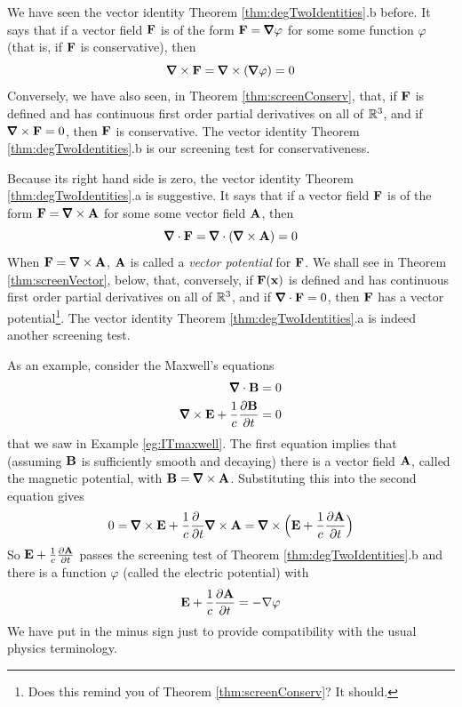 \begin{eg}\label{eg:ITmawellB}
We have seen the vector identity Theorem \ref{thm:degTwoIdentities}.b
before. It says that if a vector
field $\mathbf{F}$ is of the form $\vF = \vnabla\varphi$ for some some function 
$\varphi$ (that is, if $\mathbf{F}$ is conservative), then
\begin{equation*}
\vnabla\times\vF = \vnabla\times(\vnabla\varphi) = 0
\end{equation*}
Conversely, we have also seen, in Theorem \ref{thm:screenConserv}, 
that, if $\mathbf{F}$ is defined and has continuous first order partial 
derivatives on all of $\mathbb{R}^3$, and if $\vnabla\times\vF=0$, then
$\mathbf{F}$ is conservative. The vector identity Theorem \ref{thm:degTwoIdentities}.b
is our screening test for conservativeness.

Because its right hand side is zero, the vector identity Theorem \ref{thm:degTwoIdentities}.a is suggestive. 
It says that if a vector field $\mathbf{F}$ is of the form 
$\vF = \vnabla\times\vA$ for some some vector field $\mathbf{A}$, then
\begin{equation*}
\vnabla\cdot\vF = \vnabla\cdot(\vnabla\times\vA) = 0
\end{equation*}
When $\vF = \vnabla\times\vA$, $\mathbf{A}$ is called a \emph{vector potential}
for $\mathbf{F}$. We shall see in Theorem \ref{thm:screenVector}, below,
that, conversely, if $\mathbf{F}(\mathbf{x})$ is defined and has continuous first 
order partial derivatives on all of $\mathbb{R}^3$, and if $\vnabla\cdot\vF=0$, 
then $\mathbf{F}$ has a vector potential\footnote{Does this remind you of 
Theorem \ref{thm:screenConserv}? It should.}. The vector identity 
Theorem \ref{thm:degTwoIdentities}.a is indeed another screening test.


As an example, consider the Maxwell's equations
\begin{align*}
\vnabla\cdot\vB &= 0 \\
\vnabla\times\vE +\frac{1}{c}\frac{\partial\vB}{\partial t}&=0 
\end{align*}
that we saw in Example \ref{eg:ITmaxwell}. The first equation implies
that (assuming $\mathbf{B}$ is sufficiently smooth and decaying) there is a 
vector field $\mathbf{A}$, called the magnetic potential, with 
$\vB=\vnabla\times\vA$. Substituting this into the second equation 
gives
\begin{equation*}
0= \vnabla\times\vE +\frac{1}{c}\frac{\partial\ }{\partial t}\vnabla\times\vA
=\vnabla\times\Big(\vE+\frac{1}{c}\frac{\partial\vA }{\partial t}\Big)
\end{equation*}
So $\mathbf{E}+\frac{1}{c}\frac{\partial\mathbf{A} }{\partial t}$ passes the screening
test of Theorem \ref{thm:degTwoIdentities}.b and there is a function $\varphi$
(called the electric potential)  with 
\begin{equation*}
\mathbf{E}+\frac{1}{c}\frac{\partial\mathbf{A} }{\partial t} = -\nabla \varphi
\end{equation*}
We have put in the minus sign just to provide compatibility with the
usual physics terminology.
\end{eg}

